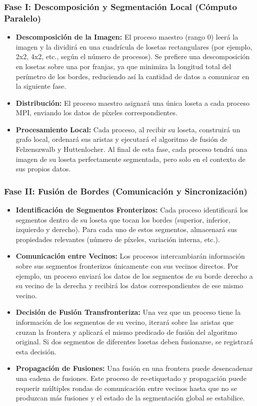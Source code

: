 \documentclass[fleqn,10pt]{article}
\begin{document}
\subsubsection*{Fase I: Descomposición y Segmentación Local (Cómputo Paralelo)}
\begin{itemize}
    \item \textbf{Descomposición de la Imagen:} El proceso maestro (rango 0) leerá la imagen y la dividirá en una cuadrícula de losetas rectangulares (por ejemplo, 2x2, 4x2, etc., según el número de procesos). Se prefiere una descomposición en losetas sobre una por franjas, ya que minimiza la longitud total del perímetro de los bordes, reduciendo así la cantidad de datos a comunicar en la siguiente fase.
    \item \textbf{Distribución:} El proceso maestro asignará una única loseta a cada proceso MPI, enviando los datos de píxeles correspondientes.
    \item \textbf{Procesamiento Local:} Cada proceso, al recibir su loseta, construirá un grafo local, ordenará sus aristas y ejecutará el algoritmo de fusión de Felzenszwalb y Huttenlocher. Al final de esta fase, cada proceso tendrá una imagen de su loseta perfectamente segmentada, pero solo en el contexto de sus propios datos.
\end{itemize}

\subsubsection*{Fase II: Fusión de Bordes (Comunicación y Sincronización)}
\begin{itemize}
    \item \textbf{Identificación de Segmentos Fronterizos:} Cada proceso identificará los segmentos dentro de su loseta que tocan los bordes (superior, inferior, izquierdo y derecho). Para cada uno de estos segmentos, almacenará sus propiedades relevantes (número de píxeles, variación interna, etc.).
    \item \textbf{Comunicación entre Vecinos:} Los procesos intercambiarán información sobre sus segmentos fronterizos únicamente con sus vecinos directos. Por ejemplo, un proceso enviará los datos de los segmentos de su borde derecho a su vecino de la derecha y recibirá los datos correspondientes de ese mismo vecino.
    \item \textbf{Decisión de Fusión Transfronteriza:} Una vez que un proceso tiene la información de los segmentos de su vecino, iterará sobre las aristas que cruzan la frontera y aplicará el mismo predicado de fusión del algoritmo original. Si dos segmentos de diferentes losetas deben fusionarse, se registrará esta decisión.
    \item \textbf{Propagación de Fusiones:} Una fusión en una frontera puede desencadenar una cadena de fusiones. Este proceso de re-etiquetado y propagación puede requerir múltiples rondas de comunicación entre vecinos hasta que no se produzcan más fusiones y el estado de la segmentación global se estabilice.
\end{itemize}
\end{document}
